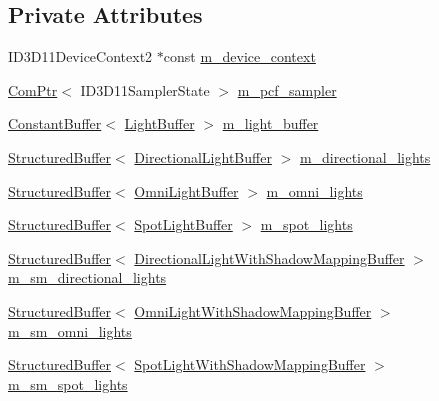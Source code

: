 \subsection*{Private Attributes}
\begin{DoxyCompactItemize}
\item 
I\+D3\+D11\+Device\+Context2 $\ast$const \hyperlink{structmage_1_1_l_buffer_pass_a1dc7614ed09b8b7d2096bcb70a69e83e}{m\+\_\+device\+\_\+context}
\item 
\hyperlink{namespacemage_ae74f374780900893caa5555d1031fd79}{Com\+Ptr}$<$ I\+D3\+D11\+Sampler\+State $>$ \hyperlink{structmage_1_1_l_buffer_pass_aaf8dacd30171f31fe2a898fbdd91a990}{m\+\_\+pcf\+\_\+sampler}
\item 
\hyperlink{structmage_1_1_constant_buffer}{Constant\+Buffer}$<$ \hyperlink{structmage_1_1_light_buffer}{Light\+Buffer} $>$ \hyperlink{structmage_1_1_l_buffer_pass_a5946e3e691734567824644f8d1ec77b9}{m\+\_\+light\+\_\+buffer}
\item 
\hyperlink{structmage_1_1_structured_buffer}{Structured\+Buffer}$<$ \hyperlink{structmage_1_1_directional_light_buffer}{Directional\+Light\+Buffer} $>$ \hyperlink{structmage_1_1_l_buffer_pass_a90327556a34fe3a56e6980accead0c44}{m\+\_\+directional\+\_\+lights}
\item 
\hyperlink{structmage_1_1_structured_buffer}{Structured\+Buffer}$<$ \hyperlink{structmage_1_1_omni_light_buffer}{Omni\+Light\+Buffer} $>$ \hyperlink{structmage_1_1_l_buffer_pass_afc2754b9d3a3b1c2171cd1a6e5b2349d}{m\+\_\+omni\+\_\+lights}
\item 
\hyperlink{structmage_1_1_structured_buffer}{Structured\+Buffer}$<$ \hyperlink{structmage_1_1_spot_light_buffer}{Spot\+Light\+Buffer} $>$ \hyperlink{structmage_1_1_l_buffer_pass_af1612aa2a8d24303ebcf9e72125698f3}{m\+\_\+spot\+\_\+lights}
\item 
\hyperlink{structmage_1_1_structured_buffer}{Structured\+Buffer}$<$ \hyperlink{structmage_1_1_directional_light_with_shadow_mapping_buffer}{Directional\+Light\+With\+Shadow\+Mapping\+Buffer} $>$ \hyperlink{structmage_1_1_l_buffer_pass_ad9a714aed008db64b5a7d9be1a5f741c}{m\+\_\+sm\+\_\+directional\+\_\+lights}
\item 
\hyperlink{structmage_1_1_structured_buffer}{Structured\+Buffer}$<$ \hyperlink{structmage_1_1_omni_light_with_shadow_mapping_buffer}{Omni\+Light\+With\+Shadow\+Mapping\+Buffer} $>$ \hyperlink{structmage_1_1_l_buffer_pass_aa5fa46c76d4d7d58141eeb021bb9f20c}{m\+\_\+sm\+\_\+omni\+\_\+lights}
\item 
\hyperlink{structmage_1_1_structured_buffer}{Structured\+Buffer}$<$ \hyperlink{structmage_1_1_spot_light_with_shadow_mapping_buffer}{Spot\+Light\+With\+Shadow\+Mapping\+Buffer} $>$ \hyperlink{structmage_1_1_l_buffer_pass_a5630c1edc1d0833d08e0350bef5ec8a5}{m\+\_\+sm\+\_\+spot\+\_\+lights}

\end{DoxyCompactItemize}
